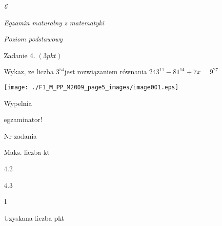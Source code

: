 \documentclass[a4paper,12pt]{article}
\begin{document}
{\it 6}

{\it Egzamin maturalny z matematyki}

{\it Poziom podstawowy}

Zadanie 4. $(3pkt)$

Wykaz, $\dot{\mathrm{z}}\mathrm{e}$ liczba $3^{54}$jest rozwiązaniem równania $243^{11}-81^{14}+7x=9^{27}$
\begin{center}
\texttt{[image: ./F1\_M\_PP\_M2009\_page5\_images/image001.eps]}
\end{center}
Wypelnia

egzaminator!

Nr zadania

Maks. liczba kt

4.2

4.3

1

Uzyskana liczba pkt
\end{document}

